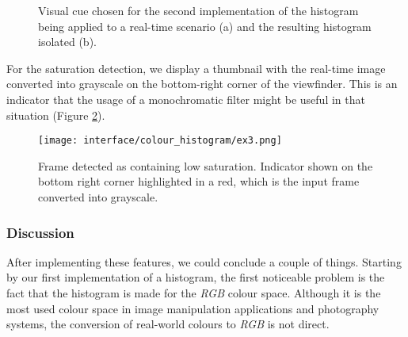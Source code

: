 \begin{figure}[htb]
	\centering
  \caption{Visual cue chosen for the second implementation of the histogram being applied to a real-time scenario (a) and the resulting histogram isolated (b). }
	\label{fig:hist_ex2}
\end{figure}

For the saturation detection, we display a thumbnail with the real-time image converted into grayscale on the bottom-right corner of the viewfinder. This is an indicator that the usage of a monochromatic filter might be useful in that situation (Figure \ref{fig:hist_ex3}).

\begin{figure}[htb]
	\centering
	\texttt{[image: interface/colour\_histogram/ex3.png]}
  	\caption{Frame detected as containing low saturation. Indicator shown on the bottom right corner highlighted in a red, which is the input frame converted into grayscale.}
	\label{fig:hist_ex3}
\end{figure}
  
\subsubsection{Discussion}
\label{subsub:disc_hist}
After implementing these features, we could conclude a couple of things. Starting by our first implementation of a histogram, the first noticeable problem is the fact that the histogram is made for the \emph{RGB} colour space. Although it is the most used colour space in image manipulation applications and photography systems, the conversion of real-world colours to \emph{RGB} is not direct.


